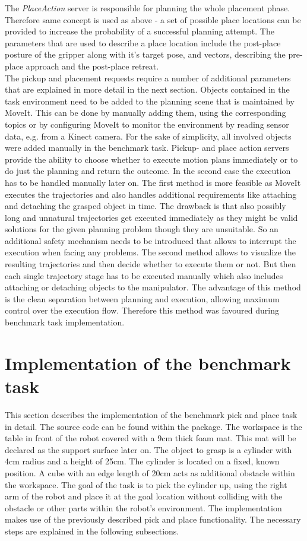 The \emph{PlaceAction} server is responsible for planning the whole placement phase. Therefore same concept is used as above - a set of possible place locations can be provided to increase the probability of a successful planning attempt. The parameters that are used to describe a place location include the post-place posture of the gripper along with it's target pose, and vectors, describing the pre-place approach and the post-place retreat.\\

The pickup and placement requests require a number of additional parameters that are explained in more detail in the next section. Objects contained in the task environment need to be added to the planning scene that is maintained by MoveIt. This can be done by manually adding them, using the corresponding topics or by configuring MoveIt to monitor the environment by reading sensor data, e.g. from a Kinect camera. For the sake of simplicity, all involved objects were added manually in the benchmark task. Pickup- and place action servers provide the ability to choose whether to execute motion plans immediately or to do just the planning and return the outcome. In the second case the execution has to be handled manually later on. The first method is more feasible as MoveIt executes the trajectories and also handles additional requirements like attaching and detaching the grasped object in time. The drawback is that also possibly long and unnatural trajectories get executed immediately as they might be valid solutions for the given planning problem though they are unsuitable. So an additional safety mechanism needs to be introduced that allows to interrupt the execution when facing any problems.
The second method allows to visualize the resulting trajectories and then decide whether to execute them or not. But then each single trajectory stage has to be executed manually which also includes attaching or detaching objects to the manipulator. The advantage of this method is the clean separation between planning and execution, allowing maximum control over the execution flow. Therefore this method was favoured during benchmark task implementation.

\section{Implementation of the benchmark task}

This section describes the implementation of the benchmark pick and place task in detail. The source code can be found within the  package. The workspace is the table in front of the robot covered with a 9cm thick foam mat. This mat will be declared as the support surface later on. The object to grasp is a cylinder with 4cm radius and a height of 25cm. The cylinder is located on a fixed, known position. A cube with an edge length of 20cm acts as additional obstacle within the workspace. The goal of the task is to pick the cylinder up, using the right arm of the robot and place it at the goal location without colliding with the obstacle or other parts within the robot's environment. The implementation makes use of the previously described pick and place functionality. The necessary steps are explained in the following subsections.

